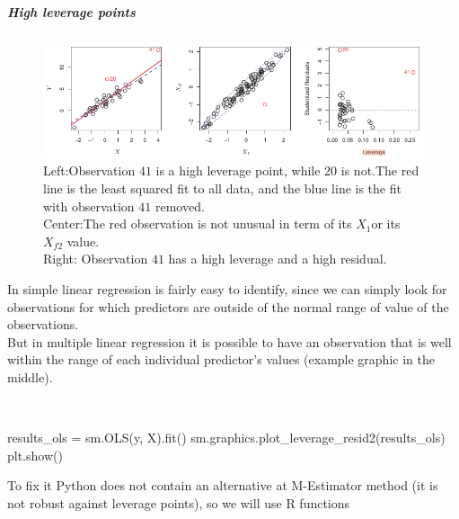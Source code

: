\subparagraph{High leverage points}
\begin{figure}[H]
	\begin{center}
		\includegraphics[width=\textwidth]{./chap/1chap/2sec/2images/2_10highLeveragePoints.png}
	\end{center}
	\caption{Left:Observation $41$ is a high leverage point, while
	20 is not.The red line is the least squared fit to all data,
	and the blue line is the fit with observation $41$ removed.\\
	Center:The red observation is not unusual in term of its $X_{1}
	$or its $X_{f2}$ value.\\Right: Observation $41$ has a high
	leverage and a high residual.}
	\label{fig:fig2.8}
\end{figure}
In simple linear regression is fairly easy to identify, since we can
simply look for observations for which predictors are outside of the
normal range of value of the observations.\\But in multiple linear
regression it is possible to have an observation that is well within
the range of each individual predictor's values (example graphic in the
middle).  \emph{}
\begin{center}
	\\
\end{center}
\begin{python}
results_ols = sm.OLS(y, X).fit()
sm.graphics.plot_leverage_resid2(results_ols)
plt.show()
\end{python}
To fix it Python does not contain an alternative at M-Estimator method (it is not robust against
leverage points), so we will use R functions

